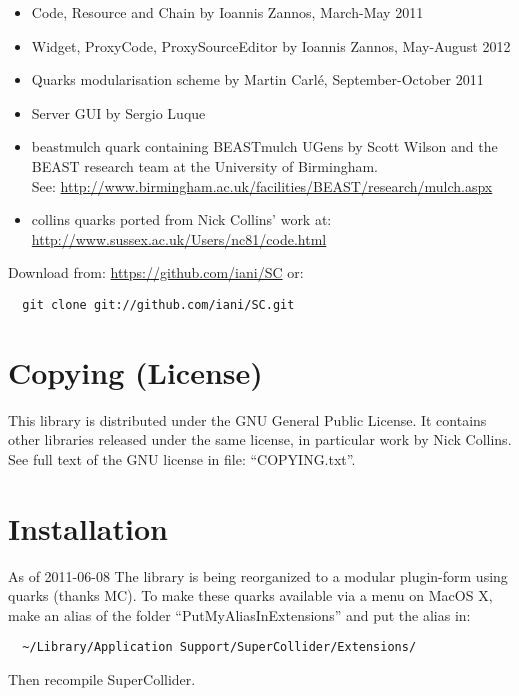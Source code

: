 \documentclass[11pt, a4paper]{scrartcl}
\begin{document}
\begin{itemize}
\item Code, Resource and Chain by Ioannis Zannos, March-May 2011
\item Widget, ProxyCode, ProxySourceEditor by Ioannis Zannos, May-August 2012
\item Quarks modularisation scheme by Martin Carl\'e, September-October 2011
\item Server GUI by Sergio Luque
\item beastmulch quark containing BEASTmulch UGens by Scott Wilson and the 
  BEAST research team at the University of Birmingham. \\ See: \href{http://www.birmingham.ac.uk/facilities/BEAST/research/mulch.aspx}{http://www.birmingham.ac.uk/facilities/BEAST/research/mulch.aspx}
\item collins quarks ported from Nick Collins' work at: \href{http://www.sussex.ac.uk/Users/nc81/code.html}{http://www.sussex.ac.uk/Users/nc81/code.html}
\end{itemize}

Download from: \href{https://github.com/iani/SC}{https://github.com/iani/SC}
or:
\begin{verbatim}
  git clone git://github.com/iani/SC.git
\end{verbatim}
\section*{Copying (License)}
\label{sec-3}


This library is distributed under the GNU General Public License. It contains other libraries released under the same license, in particular work by Nick Collins. See full text of the GNU license in file: ``COPYING.txt''.
\section*{Installation}
\label{sec-4}


As of 2011-06-08 The library is being reorganized to a modular plugin-form using quarks (thanks MC). To make these quarks available via a menu on MacOS X, make an alias of the folder ``PutMyAliasInExtensions'' and put the alias in:

\begin{verbatim}
  ~/Library/Application Support/SuperCollider/Extensions/
\end{verbatim}


Then recompile SuperCollider. 
\end{document}
